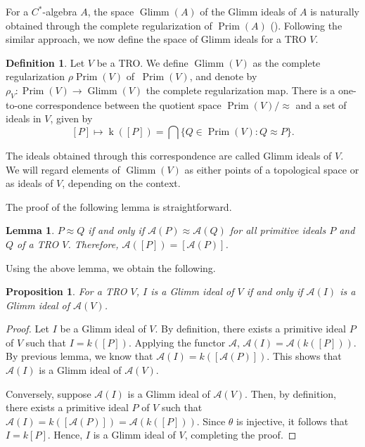\documentclass{birkjour}
\newtheorem{lem}[thm]{Lemma}
\newtheorem{prop}[thm]{Proposition}
\theoremstyle{definition}
\newtheorem{defn}[thm]{Definition}
\theoremstyle{remark}
\numberwithin{equation}{section}
\begin{document}
For a $C^{\ast}$-algebra $A$, the space $\operatorname{Glimm}(A)$ of the Glimm ideals of $A$ is naturally obtained through the complete regularization of $\operatorname{Prim}(A)$ (\cite{ARR}). Following the similar approach, we now define the space of Glimm ideals for a TRO $V$.





\begin{defn}
  
Let $V$ be a TRO. We define $\operatorname{Glimm}(V)$ as the complete regularization $\rho \operatorname{Prim}(V)$ of $\ \operatorname{Prim}(V)$, and denote by $\rho_V: \operatorname{Prim}(V) \to \operatorname{Glimm}(V)$ the complete regularization map. There is  a one-to-one correspondence between the quotient space \(\operatorname{Prim}(V) / \approx\) and a set of ideals in \(V\), given by 
\[
[P] \mapsto \operatorname{k}([P]) = \bigcap \{ Q \in \operatorname{Prim}(V) : Q \approx P \}.
\]

The ideals obtained through this correspondence are called Glimm ideals of $V$.  We will regard elements of $\operatorname{Glimm}(V)$ as either points of a topological space or as ideals of $V$, depending on the context.
  
\end{defn}

 
The proof of the following lemma is straightforward.
\begin{lem}
 $P \approx Q$ if and only if $\mathcal{A}(P) \approx \mathcal{A}(Q)$ for all primitive ideals $P$ and $Q$ of a TRO $V$. Therefore, $\mathcal{A}([P])= [\mathcal{A}(P)]$. 
\end{lem}



 Using the above lemma, we obtain the following.

\begin{prop}\label{mainglimm1} For a TRO $V$, $I$ is a Glimm ideal of $V$ if and only if $\mathcal{A}(I)$ is a Glimm ideal of $\mathcal{A}(V)$.
\end{prop}

\begin{proof}
Let \( I \) be a Glimm ideal of \( V \). By definition, there exists a primitive ideal \( P \) of \( V \) such that  $I = k([P])$.
Applying the functor \( \mathcal{A} \), $\mathcal{A}(I) = \mathcal{A}(k([P]))$. By  previous lemma, we know that  
$\mathcal{A}(I) = k([\mathcal{A}(P)])$. This shows that \( \mathcal{A}(I) \) is a Glimm ideal of \( \mathcal{A}(V) \).  

Conversely, suppose \( \mathcal{A}(I) \) is a Glimm ideal of \( \mathcal{A}(V) \). Then, by definition, there exists a primitive ideal \( P \) of \( V \) such that  $\mathcal{A}(I) = k([\mathcal{A}(P)])=\mathcal{A}(k([P]))$. Since \( \theta \) is injective, it follows that $I = k[P]$. Hence, \( I \) is a Glimm ideal of \( V \), completing the proof. 

\end{proof}
\end{document}
